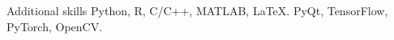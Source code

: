 \begin{rubric}{Additional skills}
%
	Python, R, C/C++, MATLAB, \LaTeX. 
%
\entry*[Technical]%
	PyQt, TensorFlow, PyTorch, OpenCV. 
%

\end{rubric}